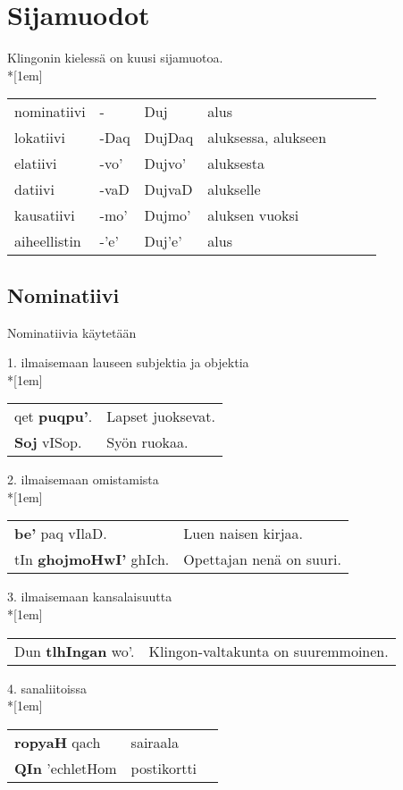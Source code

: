 \documentclass{book}
\begin{document}
\section{Sijamuodot}

Klingonin kielessä on kuusi sijamuotoa.\\*[1em]
\begin{tabular}{l Bl | Bl Il}
nominatiivi & - & Duj & alus \\
lokatiivi & -Daq & DujDaq & aluksessa, alukseen \\
elatiivi & -vo' & Dujvo' & aluksesta \\
datiivi & -vaD & DujvaD & alukselle \\
kausatiivi & -mo' & Dujmo' & aluksen vuoksi \\
aiheellistin & -'e' & Duj'e' & alus \\
\end{tabular}

\subsection{Nominatiivi}

Nominatiivia käytetään

1. ilmaisemaan lauseen subjektia ja objektia
\\*[1em]
\begin{tabular}{l l}
    qet \textbf{puqpu'}. & Lapset juoksevat. \\
    \textbf{Soj} vISop. & Syön ruokaa. \\
\end{tabular}

2. ilmaisemaan omistamista\\*[1em]
\begin{tabular}{l l}
    \textbf{be'} paq vIlaD. & Luen naisen kirjaa. \\
    tIn \textbf{ghojmoHwI'} ghIch. & Opettajan nenä on suuri. \\
\end{tabular}

3. ilmaisemaan kansalaisuutta\\*[1em]
\begin{tabular}{l l}
    Dun \textbf{tlhIngan} wo'. & Klingon-valtakunta on suuremmoinen. \\
\end{tabular}

4. sanaliitoissa\\*[1em]
\begin{tabular}{l Il}
    \textbf{ropyaH} qach & sairaala \\
    \textbf{QIn} 'echletHom & postikortti \\
\end{tabular}
\end{document}
